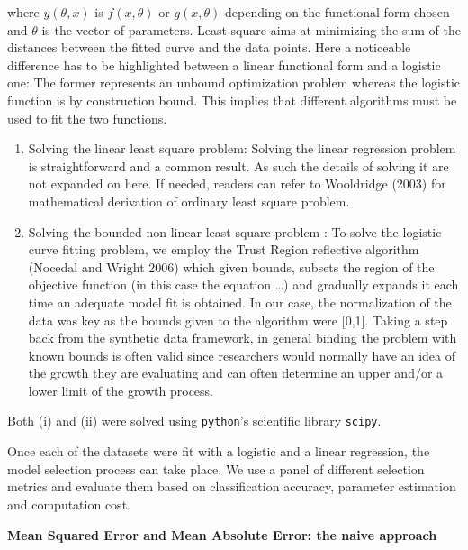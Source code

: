 \documentclass[12pt,]{article}
\begin{document}
where \(y(\theta,x)\) is \(f(x, \theta)\) or \(g(x, \theta)\) depending on the functional form chosen and \(\theta\) is the vector of parameters.
Least square aims at minimizing the sum of the distances between the fitted curve and the data points. Here a noticeable difference has to be highlighted between a linear functional form and a logistic one:
The former represents an unbound optimization problem whereas the logistic function is by construction bound. This implies that different algorithms must be used to fit the two functions.

\begin{enumerate}
\def\labelenumi{(\roman{enumi})}
\item
  Solving the linear least square problem:
  Solving the linear regression problem is straightforward and a common result. As such the details of solving it are not expanded on here. If needed, readers can refer to Wooldridge (2003) for mathematical derivation of ordinary least square problem.
\item
  Solving the bounded non-linear least square problem :
  To solve the logistic curve fitting problem, we employ the Trust Region reflective algorithm (Nocedal and Wright 2006) which given bounds, subsets the region of the objective function (in this case the equation \ldots{}) and gradually expands it each time an adequate model fit is obtained. In our case, the normalization of the data was key as the bounds given to the algorithm were {[}0,1{]}. Taking a step back from the synthetic data framework, in general binding the problem with known bounds is often valid since researchers would normally have an idea of the growth they are evaluating and can often determine an upper and/or a lower limit of the growth process.
\end{enumerate}

Both (i) and (ii) were solved using \texttt{python}'s scientific library \texttt{scipy}.

Once each of the datasets were fit with a logistic and a linear regression, the model selection process can take place. We use a panel of different selection metrics and evaluate them based on classification accuracy, parameter estimation and computation cost.

\textbf{Mean Squared Error and Mean Absolute Error: the naive approach}
\end{document}
